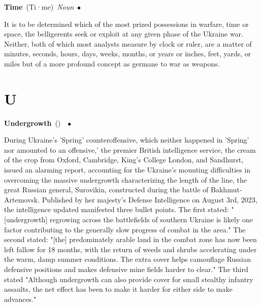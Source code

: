 \documentclass[10pt,a4paper,twoside]{article} %
\newcommand{\entry}[4]{\markboth{#1}{#1}\textbf{#1}\ {(#2)}\ \textit{#3}\ $\bullet$\ {#4}}  %
\begin{document}
\begin{multicols}{2}

\entry{Time} {Ti·me} {Noun} {

It is to be determined which of the most prized possessions in warfare, time or space, the belligerents seek or exploit at any given phase of the Ukraine war. Neither, both of which most analysts measure by clock or ruler, are a matter of minutes, seconds, hours, days, weeks, months, or years or inches, feet, yards, or miles but of a more profound concept as germane to war as weapons. 

}


\end{multicols}


\section*{U}

\begin{multicols}{2}

\entry{Undergrowth} {} {} {During Ukraine's 'Spring' counteroffensive, which neither happened in 'Spring' nor amounted to an offensive,' the premier British intelligence service, the cream of the crop from Oxford, Cambridge, King's College London, and Sandhurst, issued an alarming report, accounting for the Ukraine's mounting difficulties in overcoming the massive undergrowth characterizing the length of the line, the great Russian general, Surovikin, constructed during the battle of Bakhmut-Artemovsk. \newline \indent Published by her majesty's Defense Intelligence on August 3rd, 2023, the intelligence updated manifested three bullet points. The first stated: "[undergrowth] regrowing across the battlefields of southern Ukraine is likely one factor contributing to the generally slow progress of combat in the area." The second stated: "[the] predominately arable land in the combat zone has now been left fallow for 18 months, with the return of weeds and shrubs accelerating under the warm, damp summer conditions. The extra cover helps camouflage Russian defensive positions and makes defensive mine fields harder to clear." The third stated "Although undergrowth can also provide cover for small stealthy infantry assaults, the net effect has been to make it harder for either side to make advances." 


}


\end{multicols}
\end{document}
